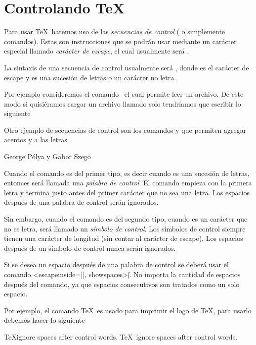 \section{Controlando \TeX}

Para usar \TeX\ haremos uso de las \emph{secuencias de control} ( o simplemente comandos). Estas son instrucciones que se podrán usar mediante un carácter especial llamado \emph{carácter de escape}, el cual usualmente será \texline{\ }.

La sintaxis de una secuencia de control usualmente será , donde  es el carácter de escape y  es una sucesión de letras o un carácter no letra.

Por ejemplo consideremos el comando \texcs\ el cual permite leer un archivo. De este modo si quisiéramos cargar un archivo llamado  solo tendríamos que escribir lo siguiente
\begin{texcode}
  
\end{texcode}

Otro ejemplo de secuencias de control son los comandos \texline{\'} y \texline{\"} que permiten agregar acentos y a las letras.
\begin{texexample}
  George P\'olya y Gabor Szeg\"o
\end{texexample}

Cuando el comando es del primer tipo, es decir cuando  es una sucesión de letras, entonces será llamada una \emph{palabra de control}. El comando empieza con la primera letra y termina justo antes del primer carácter que no sea una letra. Los espacios después de una palabra de control serán ignorados.

Sin embargo, cuando el comando es del segundo tipo, cuando  es un carácter que no es letra, será llamado un \emph{símbolo de control}. Los símbolos de control siempre tienen una carácter de longitud (sin contar al carácter de escape). Los espacios después de un símbolo de control nunca serán ignorados.

Si se desea un espacio después de una palabra de control se deberá usar el comando \texline<escapeinside=||, showspaces>{\| |}. No importa la cantidad de espacios después del comando, ya que espacios consecutivos son tratados como un solo espacio.

Por ejemplo, el comando \texcs\TeX\ es usado para imprimir el logo de \TeX, para usarlo debemos hacer lo siguiente
\begin{texexample}
  \TeX ignore spaces after control words.
  \TeX\ ignore spaces after control words.
\end{texexample}


